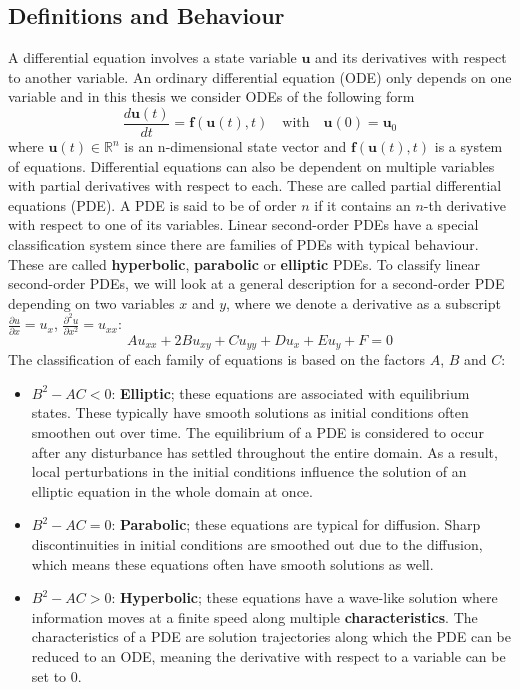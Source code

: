 \subsection{Definitions and Behaviour}
\label{subsec: continuous}
A differential equation involves a state variable $\textbf{u}$ and its derivatives with respect to another variable. An ordinary differential equation (ODE) only depends on one variable and in this thesis we consider ODEs of the following form
\begin{equation}
\label{eq: ODE}
    \frac{d \textbf{u}(t)}{d t} = \textbf{f}(\textbf{u}(t),t) \quad \text{with} \quad \textbf{u}(0) = \textbf{u}_0
    \end{equation}
where $\textbf{u}(t) \in \mathbb{R}^n$ is an n-dimensional state vector and $\textbf{f}(\textbf{u}(t), t)$ is a system of equations. 
Differential equations can also be dependent on multiple variables with partial derivatives with respect to each. These are called partial differential equations (PDE). A PDE is said to be of order $n$ if it contains an $n$-th derivative with respect to one of its variables. Linear second-order PDEs have a special classification system since there are families of PDEs with typical behaviour. These are called \textbf{hyperbolic}, \textbf{parabolic} or \textbf{elliptic} PDEs. To classify linear second-order PDEs, we will look at a general description for a second-order PDE depending on two variables $x$ and $y$, where we denote a derivative as a subscript $\frac{\partial u}{\partial x} = u_x$, $\frac{\partial^2 u}{\partial x^2} = u_{xx}$:
\begin{equation}
\label{eq: pde classification}
    A u_{xx}+2Bu_{xy}+Cu_{yy}+Du_x+Eu_y+F=0
\end{equation}
The classification of each family of equations is based on the factors $A$, $B$ and $C$:
\begin{itemize}
    \item $B^2 - AC < 0$: \textbf{Elliptic}; these equations are associated with equilibrium states. These typically have smooth solutions as initial conditions often smoothen out over time. The equilibrium of a PDE is considered to occur after any disturbance has settled throughout the entire domain. As a result, local perturbations in the initial conditions influence the solution of an elliptic equation in the whole domain at once.
    \item $B^2 - AC = 0$: \textbf{Parabolic}; these equations are typical for diffusion. Sharp discontinuities in initial conditions are smoothed out due to the diffusion, which means these equations often have smooth solutions as well.
    \item $B^2 - AC > 0$: \textbf{Hyperbolic}; these equations have a wave-like solution where information moves at a finite speed along multiple \textbf{characteristics}. The characteristics of a PDE are solution trajectories along which the PDE can be reduced to an ODE, meaning the derivative with respect to a variable can be set to 0.
\end{itemize}
